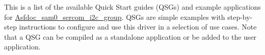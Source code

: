 This is a list of the available Quick Start guides (QSGs) and example applications for \mbox{\hyperlink{group__asfdoc__sam0__sercom__i2c__group}{Asfdoc\+\_\+sam0\+\_\+sercom\+\_\+i2c\+\_\+group}}. QSGs are simple examples with step-\/by-\/step instructions to configure and use this driver in a selection of use cases. Note that a QSG can be compiled as a standalone application or be added to the user application.